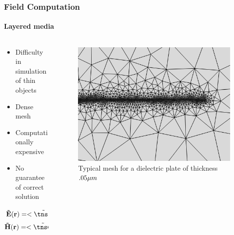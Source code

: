 \documentclass[mathserif,18pt,xcolor=table]{beamer}
\begin{document}
  \begin{frame}
    \frametitle{Field Computation}
    \framesubtitle{Layered media}
    \begin{columns} %
      \begin{column}[T]{.5\textwidth}
        \begin{itemize}
          \item Difficulty in simulation of thin objects
          \item Dense mesh
          \item Computationally expensive
          \item No guarantee of correct solution
        \end{itemize}
        \begin{subequations}
          \begin{align}
            \v{\ti E}(\v{r}) = <{\ti {\tns G}}^{EJ} ; \v{\ti J}(\v{r'})>
            \label{eq:E_GJ}\\
            \v{\ti H}(\v{r}) = <{\ti {\tns G}}^{HJ} ; \v{\ti J}(\v{r'})>
          \end{align}
          \label{eq:EH_GJ}
        \end{subequations}
      \end{column}
      \begin{column}[T]{.5\textwidth}
        \begin{figure}[!t]
           \noindent
           \includegraphics[width=1\textwidth]{figures/mesh.png}
           \caption{Typical mesh for a dielectric plate of thickness $.05 \mu m$}
           \label{fig:mesh}
        \end{figure}
        \end{column}%
      \end{columns}
    \end{frame}
\end{document}

